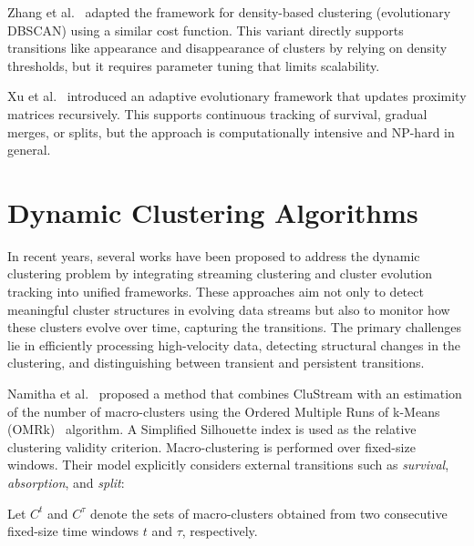 Zhang et al.~\cite{density_evolutionary_clustering} adapted the framework for
density-based clustering (evolutionary DBSCAN) using a similar cost function.
This variant directly supports transitions like appearance and disappearance of
clusters by relying on density thresholds, but it requires parameter tuning
that limits scalability.

Xu et al.~\cite{adaptive_evolutionary_clustering} introduced an adaptive
evolutionary framework that updates proximity matrices recursively. This
supports continuous tracking of survival, gradual merges, or splits, but the
approach is computationally intensive and NP-hard in general.

\section{Dynamic Clustering Algorithms}\label{sec:dynamic_clustering_algorithms}

In recent years, several works have been proposed to address the dynamic
clustering problem by integrating streaming clustering and cluster evolution
tracking into unified frameworks. These approaches aim not only to detect
meaningful cluster structures in evolving data streams but also to monitor how
these clusters evolve over time, capturing the transitions. The primary
challenges lie in efficiently processing high-velocity data, detecting
structural changes in the clustering, and distinguishing between transient and
persistent transitions.

Namitha et al.~\cite{namitha_dynamic_clustering_1} proposed a method that
combines CluStream with an estimation of the number of macro-clusters using the
Ordered Multiple Runs of k-Means (OMRk)~\cite{omrk} algorithm. A Simplified
Silhouette index is used as the relative clustering validity criterion.
Macro-clustering is performed over fixed-size windows. Their model explicitly
considers external transitions such as \emph{survival}, \emph{absorption}, and
\emph{split}:

Let $ C^t $ and $ C^\tau $ denote the sets of macro-clusters obtained from two
consecutive fixed-size time windows $ t $ and $ \tau $, respectively.

